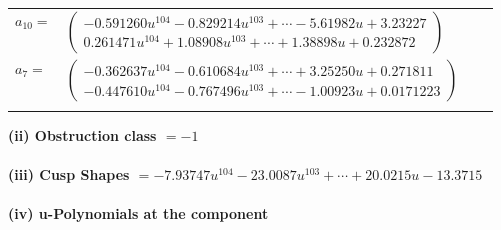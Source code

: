 \documentclass[1p]{elsarticle_modified}
\theoremstyle{definition}
\begin{document}
\begin{tabular}{m{7pt} m{180pt} m{7pt} m{180pt} }
\flushright $a_{10}=$&$\begin{pmatrix}-0.591260 u^{104}-0.829214 u^{103}+\cdots-5.61982 u+3.23227\\0.261471 u^{104}+1.08908 u^{103}+\cdots+1.38898 u+0.232872\end{pmatrix}$ \\
\flushright $a_{7}=$&$\begin{pmatrix}-0.362637 u^{104}-0.610684 u^{103}+\cdots+3.25250 u+0.271811\\-0.447610 u^{104}-0.767496 u^{103}+\cdots-1.00923 u+0.0171223\end{pmatrix}$\\&\end{tabular}
\flushleft \textbf{(ii) Obstruction class $= -1$}\\~\\
\flushleft \textbf{(iii) Cusp Shapes $= -7.93747 u^{104}-23.0087 u^{103}+\cdots+20.0215 u-13.3715$}\\~\\
\newpage\renewcommand{\arraystretch}{1}
\flushleft \textbf{(iv) u-Polynomials at the component}\newline \\
\end{document}
